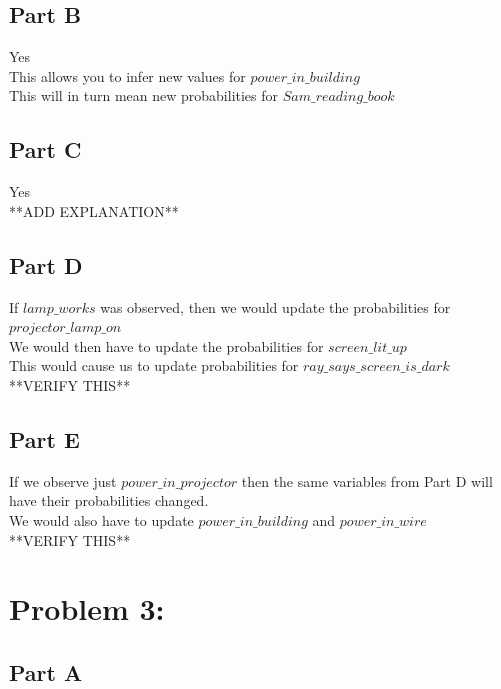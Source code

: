 \documentclass[twoside,11pt]{article}
\theoremstyle{definition}
\begin{document}
\subsection*{Part B}

Yes\\
This allows you to infer new values for $\textit{power\_in\_building}$\\
This will in turn mean new probabilities for $\textit{Sam\_reading\_book}$\\

\subsection*{Part C}

Yes\\
**ADD EXPLANATION**

\subsection*{Part D}

If $\textit{lamp\_works}$ was observed, then we would update the probabilities for $\textit{projector\_lamp\_on}$\\
We would then have to update the probabilities for $\textit{screen\_lit\_up}$\\
This would cause us to update probabilities for $\textit{ray\_says\_screen\_is\_dark}$\\
**VERIFY THIS**

\subsection*{Part E}

If we observe just $\textit{power\_in\_projector}$ then the same variables from Part D will have their probabilities changed.\\
We would also have to update $\textit{power\_in\_building}$ and $\textit{power\_in\_wire}$\\
**VERIFY THIS**

\newpage

\section*{Problem 3: }

\subsection*{Part A}
\end{document}
